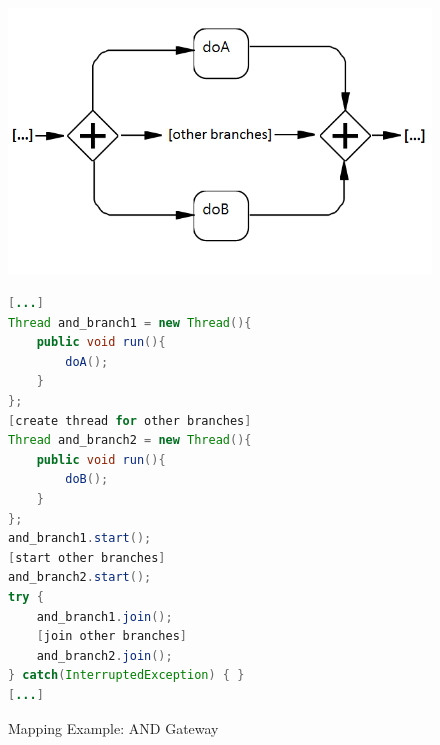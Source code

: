 \begin{figure}[h]%
\begin{minipage}[c]{0.5\textwidth} 
\includegraphics[width=0.95\linewidth]{images/mapping/and-gateway.png}
\end{minipage}
\begin{minipage}[c]{0.5\textwidth} 
\begin{lstlisting}[language=Java]
[...]
Thread and_branch1 = new Thread(){
	public void run(){
		doA();
	}
};
[create thread for other branches]
Thread and_branch2 = new Thread(){
	public void run(){
		doB();
	}
};
and_branch1.start();
[start other branches]
and_branch2.start();
try {
	and_branch1.join();
	[join other branches]
	and_branch2.join();
} catch(InterruptedException) { }
[...]
\end{lstlisting}
\end{minipage}
\caption{Mapping Example: AND Gateway}%
\label{fig:mapping_AND}%
\end{figure}



